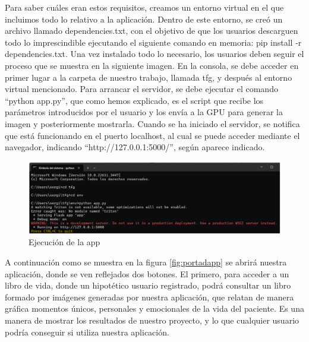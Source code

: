 Para saber cuáles eran estos requisitos, creamos un entorno virtual en el que incluimos todo lo relativo a la aplicación. Dentro de este entorno, se creó un archivo llamado dependencies.txt, con el objetivo de que los usuarios descarguen todo lo imprescindible ejecutando el siguiente comando en memoria: pip install -r dependencies.txt. Una vez instalado todo lo necesario, los usuarios deben seguir el proceso que se muestra en la siguiente imagen. En la consola, se debe acceder en primer lugar a la carpeta de nuestro trabajo, llamada tfg, y después al entorno virtual mencionado. Para arrancar el servidor, se debe ejecutar el comando “python app.py”, que como hemos explicado, es el script que recibe los parámetros introducidos por el usuario y los envía a la GPU para generar la imagen y posteriormente mostrarla. Cuando se ha iniciado el servidor, se notifica que está funcionando en el puerto localhost, al cual se puede acceder mediante el navegador, indicando “http://127.0.0.1:5000/”, según aparece indicado. \\
\begin{figure}[!htb]
	\centering
	\includegraphics[width = 1
	\textwidth]{Imagenes/Vectorial/exeapp.png}
	\caption{Ejecución de la app}
	\label{fig:appexe}
\end{figure}

A continuación como se muestra en la figura \ref{fig:portadapp} se abrirá nuestra aplicación, donde se ven reflejados dos botones. El primero, para acceder a un libro de vida, donde un hipotético usuario registrado, podrá consultar un libro formado por imágenes generadas por nuestra aplicación, que relatan de manera gráfica momentos únicos, personales y emocionales de la vida del paciente. Es una manera de mostrar los resultados de nuestro proyecto, y lo que cualquier usuario podría conseguir si utiliza nuestra aplicación. \\

